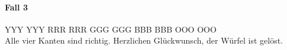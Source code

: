 \paragraph{Fall 3}
\RubikCubeGreyAll%
            {Y}{Y}{Y}
            {Y}{Y}{Y}%
               {R}{R}{R}
	       {R}{R}{R}%
	       {G}{G}{G}
	       {G}{G}{G}%
	      {B}{B}{B}
	      {B}{B}{B}%
	      {O}{O}{O}
	      {O}{O}{O}%
\\[1em]
Alle vier Kanten sind richtig. Herzlichen Glückwunsch, der Würfel ist gelöst.
